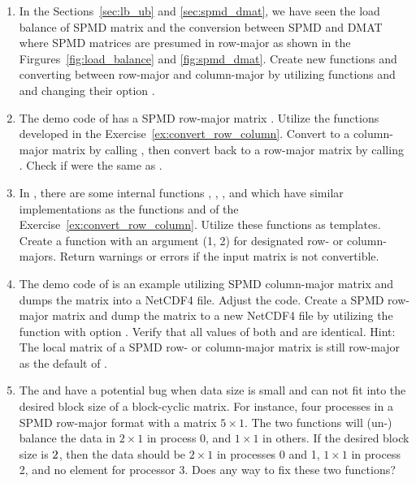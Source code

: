 \begin{enumerate}[label=\thechapter-\arabic*]
\item
\label{ex:convert_row_column}
In the Sections~\ref{sec:lb_ub} and \ref{sec:spmd_dmat},
we have seen the load balance of SPMD matrix
and the conversion between SPMD and DMAT where SPMD matrices 
are presumed in row-major as shown in
the Firgures~\ref{fig:load_balance} and \ref{fig:spmd_dmat}.
Create new functions
 and  converting between
row-major and column-major by utilizing functions 
and  and changing their option .

\item
The demo code  of  has a SPMD row-major
matrix .
Utilize the functions developed in the
Exercise~\ref{ex:convert_row_column}.
Convert  to a column-major matrix 
by calling , then convert  back to a
row-major matrix  by calling .
Check if  were the same as .

\item
In , there are some internal functions ,
, , and
 which have similar implementations as the
functions  and  of the
Exercise~\ref{ex:convert_row_column}. Utilize these functions as templates.
Create a function  with an argument  (1, 2)
for designated row- or column-majors.
Return warnings or errors if the input matrix is not convertible.

\item
\label{ex:nc4_spmdr}
The demo code  of  is an example utilizing
SPMD column-major matrix  
and dumps the matrix into a NetCDF4
file. Adjust the code. Create a SPMD row-major matrix  and dump
the matrix to a new NetCDF4 file  by utilizing the function
 with option . Verify that all
 values of both  and 
are identical.
{\color{blue}Hint:
The local matrix of a SPMD row- or column-major matrix is still
row-major as the default of .
}

\item
The  and  have a potential bug
when data size is small and can not fit into the desired block size of
a block-cyclic matrix. For instance, four processes in
a SPMD row-major format with a matrix $5\times 1$. The two functions will
(un-) balance the data in $2\times 1$ in process 0, and $1\times 1$ in others.
If the desired block size is $2\time 1$, then the data should be
$2\times 1$ in processes 0 and 1, $1\times 1$ in process 2, and no
element for processor 3. Does any way to fix these two functions?

\end{enumerate}


